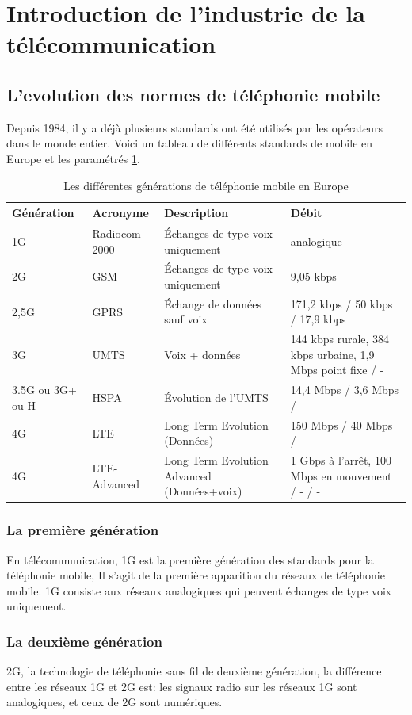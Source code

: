 \section{Introduction de l'industrie de la télécommunication}
\subsection{L'evolution des normes de téléphonie mobile}
Depuis 1984, il y a déjà plusieurs standards ont été utilisés par les opérateurs dans le monde entier. Voici un tableau de différents standards de mobile en Europe et les paramétrés \ref{tbl:GMIE}. 
\begin{table}[H]
\begin{tabular}{|p{2cm}|p{2cm}|p{2cm}|p{4cm}|}
	\hline
	Génération&Acronyme&Description&Débit\\
	\hline
	1G		&Radiocom 2000	&Échanges de type voix uniquement&analogique\\
	\hline
	\hline
	2G		&GSM			&Échanges de type voix uniquement	&9,05 kbps\\
	\hline
	2,5G	&GPRS			&Échange de données sauf voix		&171,2 kbps / 50 kbps / 17,9 kbps\\
	\hline
	\hline
	3G		&UMTS			&Voix + données						&144 kbps rurale, 384 kbps urbaine, 1,9 Mbps point fixe / -\\
	\hline
	3.5G ou 3G+ ou H&HSPA	&Évolution de l'UMTS				&14,4 Mbps / 3,6 Mbps / -\\
	\hline
	\hline
	4G		&LTE			&Long Term Evolution (Données)				&150 Mbps / 40 Mbps / -\\
	\hline
	4G		&LTE-Advanced	&Long Term Evolution Advanced (Données+voix)		&1 Gbps à l'arrêt, 100 Mbps en mouvement / - / -\\
	\hline
\end{tabular}
\caption{Les différentes générations de téléphonie mobile en Europe}
 \label{tbl:GMIE}
\end{table}

\subsubsection{La première génération}
En télécommunication, \textsf{1G} est la première génération des standards pour la téléphonie mobile, Il s'agit de la première apparition du réseaux de téléphonie mobile. 1G consiste aux réseaux analogiques qui peuvent échanges de type voix uniquement.
\subsubsection{La deuxième génération}
\textsf{2G}, la technologie de téléphonie sans fil de deuxième génération, la différence entre les réseaux 1G et 2G est: les signaux radio sur les réseaux 1G sont analogiques, et ceux de 2G sont numériques.

